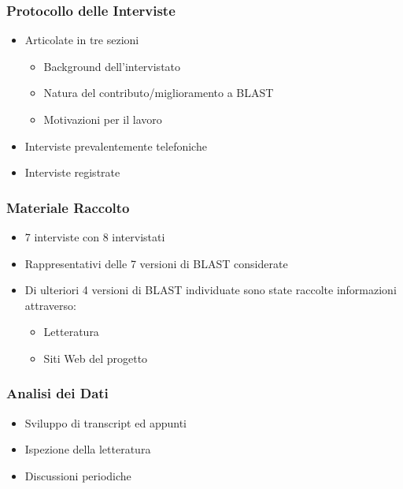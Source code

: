 \begin{frame}\frametitle{Protocollo delle Interviste}

\begin{itemize}[<+->]
\itemsep1pt\parskip0pt
\item
  Articolate in tre sezioni

  \begin{itemize}[<+->]
  \itemsep1pt\parskip0pt
  \item
    Background dell'intervistato
  \item
    Natura del contributo/miglioramento a BLAST
  \item
    Motivazioni per il lavoro
  \end{itemize}
\item
  Interviste prevalentemente telefoniche
\item
  Interviste registrate
\end{itemize}

\end{frame}

\begin{frame}\frametitle{Materiale Raccolto}

\begin{itemize}[<+->]
\itemsep1pt\parskip0pt
\item
  7 interviste con 8 intervistati
\item
  Rappresentativi delle 7 versioni di BLAST considerate
\item
  Di ulteriori 4 versioni di BLAST individuate sono state raccolte
  informazioni attraverso:

  \begin{itemize}[<+->]
  \itemsep1pt\parskip0pt
  \item
    Letteratura
  \item
    Siti Web del progetto
  \end{itemize}
\end{itemize}

\end{frame}

\begin{frame}\frametitle{Analisi dei Dati}

\begin{itemize}[<+->]
\itemsep1pt\parskip0pt
\item
  Sviluppo di transcript ed appunti
\item
  Ispezione della letteratura
\item
  Discussioni periodiche
\end{itemize}

\end{frame}

